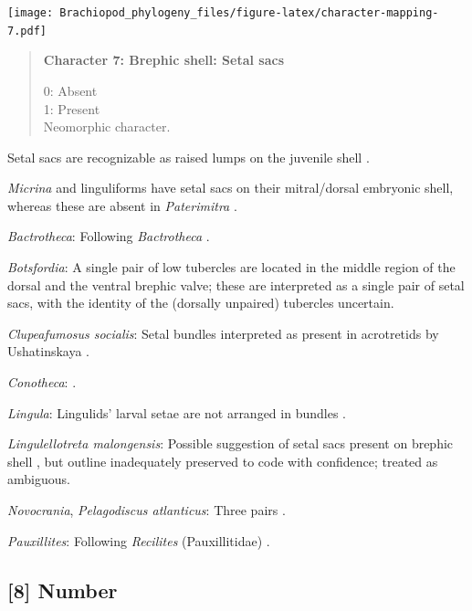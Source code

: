 \documentclass[openany]{book}
\begin{document}
\texttt{[image: Brachiopod\_phylogeny\_files/figure-latex/character-mapping-7.pdf]}

\begin{quote}
\textbf{Character 7: Brephic shell: Setal sacs}

0: Absent\\
1: Present\\
Neomorphic character.
\end{quote}

Setal sacs are recognizable as raised lumps on the juvenile shell
\citep[see][]{Bassett2017Earliestontogeny}.

\emph{Micrina} and linguliforms have setal sacs on their mitral/dorsal
embryonic shell, whereas these are absent in \emph{Paterimitra}
\citep{Holmer2011Firstrecord}.

\hypertarget{Bactrotheca-coding-7}{}
\emph{Bactrotheca}: Following \emph{Bactrotheca}
\citep{Dzik1980Ontogenyof}.

\hypertarget{Botsfordia-coding-7}{}
\emph{Botsfordia}: A single pair of low tubercles are \citep[ state
``may be'']{Ushatinskaya2016Revisionof} located in the middle region of
the dorsal and the ventral brephic valve; these are interpreted as a
single pair of setal sacs, with the identity of the (dorsally unpaired)
tubercles uncertain.

\hypertarget{Clupeafumosus_socialis-coding-7}{}
\emph{Clupeafumosus socialis}: Setal bundles interpreted as present in
acrotretids by Ushatinskaya \citeyearpar{Ushatinskaya2016Protegulumand}.

\hypertarget{Conotheca-coding-7}{}
\emph{Conotheca}: \citep{Wrona2003}.

\hypertarget{Lingula-coding-7}{}
\emph{Lingula}: Lingulids' larval setae are not arranged in bundles
\citep{Carlson1995Phylogeneticrelationships}.

\hypertarget{Lingulellotreta_malongensis-coding-7}{}
\emph{Lingulellotreta malongensis}: Possible suggestion of setal sacs
present on brephic shell \citep{Holmer1997EarlyCambrian, Li2004}, but
outline inadequately preserved to code with confidence; treated as
ambiguous.

\hypertarget{Novocrania-coding-7}{}
\emph{Novocrania}, \emph{Pelagodiscus atlanticus}: Three pairs
\citep{Carlson1995Phylogeneticrelationships}.

\hypertarget{Pauxillites-coding-7}{}
\emph{Pauxillites}: Following \emph{Recilites} (Pauxillitidae)
\citep{Dzik1978}.

\subsection*{{[}8{]} Number}\label{number}
\end{document}

